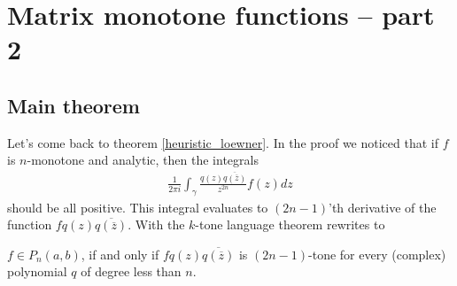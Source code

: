 \chapter{Matrix monotone functions -- part 2}

\section{Main theorem}

Let's come back to theorem \ref{heuristic_loewner}. In the proof we noticed that if $f$ is $n$-monotone and analytic, then the integrals
\begin{align*}
	\frac{1}{2 \pi i} \int_{\gamma}  \frac{q(z) \overline{q(\overline{z})}}{z^{2 n}} f(z) dz
\end{align*}
should be all positive. This integral evaluates to $(2 n - 1)$'th derivative of the function $f q(z) \overline{q(\overline{z})}$. With the $k$-tone language theorem rewrites to

\begin{lause}\label{main_theorem}
	$f \in P_{n}(a, b)$, if and only if $f q(z) \overline{q(\overline{z})}$ is $(2 n - 1)$-tone for every (complex) polynomial $q$ of degree less than $n$.
\end{lause}


